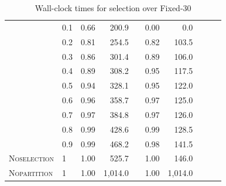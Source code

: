 \begin{table}
\begin{tabular}{@{}llrrrrrrrr@{}}
& 0.1 & 0.66 & 200.9 && 0.00 & 0.0\\
& 0.2 & 0.81 & 254.5 && 0.82 & 103.5\\
& 0.3 & 0.86 & 301.4 && 0.89 & 106.0\\
& 0.4 & 0.89 & 308.2 && 0.95 & 117.5\\
& 0.5 & 0.94 & 328.1 && 0.95 & 122.0\\
& 0.6 & 0.96 & 358.7 && 0.97 & 125.0\\
& 0.7 & 0.97 & 384.8 && 0.97 & 126.0\\
& 0.8 & 0.99 & 428.6 && 0.99 & 128.5\\
& 0.9 & 0.99 & 468.2 && 0.98 & 141.5\\
\textsc{Noselection}& 1 & 1.00 & 525.7 && 1.00 & 146.0\\
\textsc{Nopartition}& 1 & 1.00 & 1,014.0 && 1.00 & 1,014.0\\
   \bottomrule
  \end{tabular}
\caption{Wall-clock times for selection over Fixed-30}
\label{tab:selection_wct_fixed}
\end{table}


